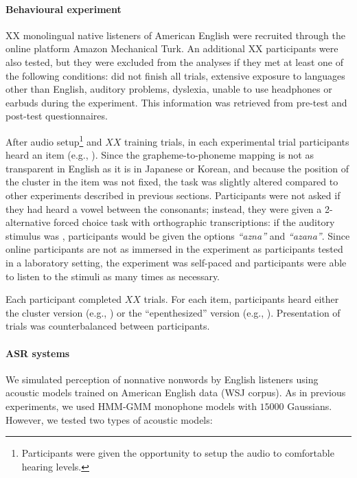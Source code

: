 {\paragraph{Behavioural experiment}
{\color{red}XX} monolingual native listeners of American English were recruited through the online platform Amazon Mechanical Turk. An additional {\color{red}XX participants were also tested, but they were excluded from the analyses if they met at least one of the following conditions: did not finish all trials, extensive exposure to languages other than English, auditory problems, dyslexia, unable to use headphones or earbuds during the experiment}. This information was retrieved from pre-test and post-test questionnaires.

After audio setup\footnote{Participants were given the opportunity to setup the audio to comfortable hearing levels.} and {\color{red}$XX$} training trials, in each experimental trial participants heard an item (e.g., ). Since the grapheme-to-phoneme mapping is not as transparent in English as it is in Japanese or Korean, and because the position of the cluster in the item was not fixed, the task was slightly altered compared to other experiments described in previous sections. Participants were not asked if they had heard a vowel between the consonants; instead, they were given a 2-alternative forced choice task with orthographic transcriptions: if the auditory stimulus was , participants would be given the options \textit{``azna''} and  \textit{``azana''}. Since online participants are not as immersed in the experiment as participants tested in a laboratory setting, the experiment was self-paced and participants were able to listen to the stimuli as many times as necessary.

Each participant completed {\color{red}$XX$} trials. For each item, participants heard either the cluster version (e.g., ) or the ``epenthesized'' version (e.g., ). Presentation of trials was counterbalanced between participants.   


\paragraph{ASR systems}
We simulated perception of nonnative nonwords by English listeners using acoustic models trained on American English data (WSJ corpus). As in previous experiments, we used HMM-GMM monophone models with $15000$ Gaussians. However, we tested two types of acoustic models:

}
